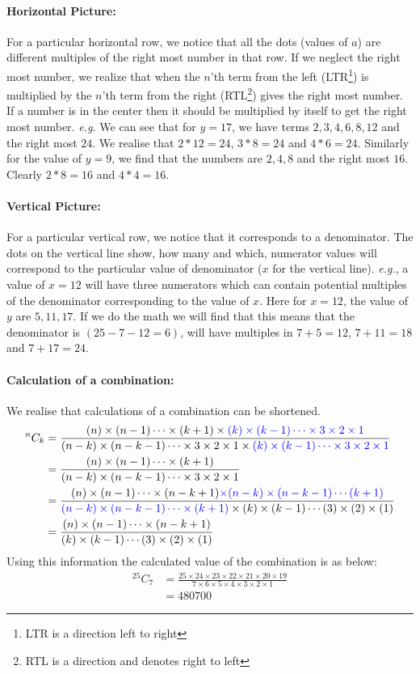 \documentclass[10pt, twoside]{article}
\newcommand*{\Combination}[2]{{}^{#1}C_{#2}}%
\begin{document}
\paragraph{Horizontal Picture:} For a particular horizontal row, we notice that all the dots (values of \textbf{$a$}) are different multiples of the right most number in that row. If we neglect the right most number, we realize that when the $n$'th term from the left (LTR\footnote{LTR is a direction left to right}) is multiplied by the $n$'th term from the right (RTL\footnote{RTL is a direction and denotes right to left}) gives the right most number. If a number is in the center then it should be multiplied by itself to get the right most number. \textit{e.g.} We can see that for $y=17$, we have terms $2, 3, 4, 6, 8, 12$ and the right most $24$. We realise that $2*12=24$, $3*8=24$ and $4*6=24$. Similarly for the value of $y=9$, we find that the numbers are $2, 4, 8$ and the right most $16$. Clearly $2*8=16$ and $4*4=16$.
\paragraph{Vertical Picture:} For a particular vertical row, we notice that it corresponds to a denominator. The dots on the vertical line show, how many and which, numerator values will correspond to the particular value of denominator ($x$ for the vertical line). \textit{e.g.}, a value of $x=12$ will have three numerators which can contain potential multiples of the denominator corresponding to the value of $x$. Here for $x=12$, the value of $y$ are $5, 11, 17$. If we do the math we will find that this means that the denominator is $(25-7-12=6)$, will have multiples in $7+5=12$, $7+11=18$ and $7+17=24$.
\paragraph{Calculation of a combination:}\label{ShortenedCalculation} We realise that calculations of a combination can be shortened.
\begin{align*}
 		\Combination{n}{k} &= \frac{(n)\times(n-1)\cdots\times(k+1)\times\color{blue}(k)\times(k-1)\cdots\times3\times2\times1}{(n-k)\times(n-k-1)\cdots\times3\times2\times1\times\color{blue}(k)\times(k-1)\cdots\times3\times2\times1}\\
 		&= \frac{(n)\times(n-1)\cdots\times(k+1)}{(n-k)\times(n-k-1)\cdots\times3\times2\times1}\\
 		&=\frac{(n)\times(n-1)\cdots\times(n-k+1){\color{blue}\times(n-k)\times(n-k-1)\cdots(k+1)}}{{\color{blue}(n-k)\times(n-k-1)\cdots\times(k+1)}\times(k)\times(k-1)\cdots(3)\times(2)\times(1)} \\
 		&=\frac{(n)\times(n-1)\cdots\times(n-k+1)}{(k)\times(k-1)\cdots(3)\times(2)\times(1)}
\end{align*}
Using this information the calculated value of the combination is as below:
\begin{align*}
	\Combination{25}{7} &= \frac{25\times24\times23\times22\times21\times20\times19}{7\times6\times5\times4\times3\times2\times1} \\
	&= 480700
\end{align*}
\end{document}
